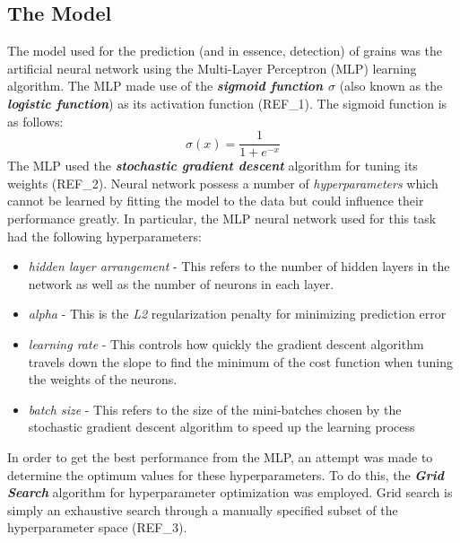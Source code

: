 \subsection{The Model}
The model used for the prediction (and in essence, detection) of grains was the artificial neural network using the Multi-Layer Perceptron (MLP) learning algorithm. The MLP made use of the \textit{\textbf{sigmoid function $\sigma$}} (also known as the \textbf{\textit{logistic function}}) as its activation function (REF\_1). The sigmoid function is as follows:
\begin{equation}
\sigma(x) = \frac{1}{1 + e^{-x}}
\end{equation}
The MLP used the \textit{\textbf{stochastic gradient descent}} algorithm for tuning its weights (REF\_2). Neural network possess a number of \textit{hyperparameters} which cannot be learned by fitting the model to the data but could influence their performance greatly. In particular, the MLP neural network used for this task had the following hyperparameters:
\begin{itemize}
\item \textit{hidden layer arrangement} - This refers to the number of hidden layers in the network as well as the number of neurons in each layer.
\item \textit{alpha} - This is the \textit{L2} regularization penalty for minimizing prediction error
\item \textit{learning rate} - This controls how quickly the gradient descent algorithm travels down the slope to find the minimum of the cost function when tuning the weights of the neurons.
\item \textit{batch size} - This refers to the size of the mini-batches chosen by the stochastic gradient descent algorithm to speed up the learning process
\end{itemize}
In order to get the best performance from the MLP, an attempt was made to determine the optimum values for these hyperparameters. To do this, the \textit{\textbf{Grid Search}} algorithm for hyperparameter optimization was employed. Grid search is simply an exhaustive search through a manually specified subset of the hyperparameter space (REF\_3).

